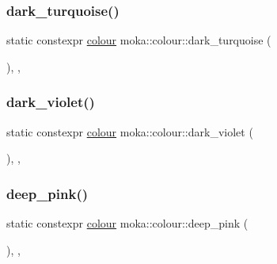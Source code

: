 \subsubsection{\texorpdfstring{dark\_turquoise()}{dark\_turquoise()}}
{\footnotesize\ttfamily static constexpr \mbox{\hyperlink{classmoka_1_1colour}{colour}} moka\+::colour\+::dark\+\_\+turquoise (\begin{DoxyParamCaption}{ }\end{DoxyParamCaption})\hspace{0.3cm}{\ttfamily [inline]}, {\ttfamily [static]}, {\ttfamily [noexcept]}}

\mbox{\label{classmoka_1_1colour_aa106ab839ce65b31b3f58c1b1844a926}} 
\subsubsection{\texorpdfstring{dark\_violet()}{dark\_violet()}}
{\footnotesize\ttfamily static constexpr \mbox{\hyperlink{classmoka_1_1colour}{colour}} moka\+::colour\+::dark\+\_\+violet (\begin{DoxyParamCaption}{ }\end{DoxyParamCaption})\hspace{0.3cm}{\ttfamily [inline]}, {\ttfamily [static]}, {\ttfamily [noexcept]}}

\mbox{\label{classmoka_1_1colour_a0821345901f797126f4169eeea3ed75a}} 
\subsubsection{\texorpdfstring{deep\_pink()}{deep\_pink()}}
{\footnotesize\ttfamily static constexpr \mbox{\hyperlink{classmoka_1_1colour}{colour}} moka\+::colour\+::deep\+\_\+pink (\begin{DoxyParamCaption}{ }\end{DoxyParamCaption})\hspace{0.3cm}{\ttfamily [inline]}, {\ttfamily [static]}, {\ttfamily [noexcept]}}

\mbox{\label{classmoka_1_1colour_a935483a6bc1930d7d84c6dd0b7f1353f}} 
